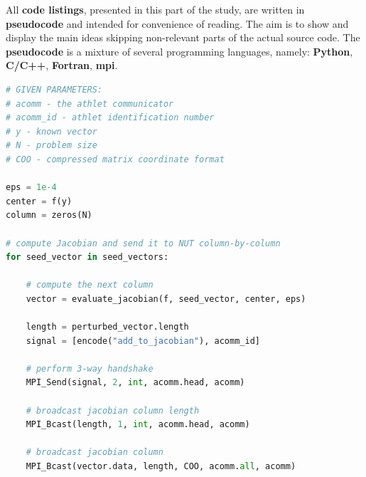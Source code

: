 All \textbf{code listings}, presented in this part of the study, are written in \textbf{pseudocode} and intended for convenience of reading. The aim is to show and display the main ideas skipping non-relevant parts of the actual source code. The \textbf{pseudocode} is a mixture of several programming languages, namely: \textbf{Python}, \textbf{C/C++}, \textbf{Fortran}, \textbf{\acrshort{mpi}}.\\


\begin{minipage}{\linewidth}
\begin{lstlisting}[language=python, caption={Pseudocode of the original \acrshort{athlet}-\acrshort{nut} coupling: \acrshort{athlet} part}, frame=single, label={lst:athlet-grs-defaul:athlet}]
# GIVEN PARAMETERS:
# acomm - the athlet communicator
# acomm_id - athlet identification number 
# y - known vector
# N - problem size
# COO - compressed matrix coordinate format

eps = 1e-4
center = f(y)
column = zeros(N)

# compute Jacobian and send it to NUT column-by-column
for seed_vector in seed_vectors:

	# compute the next column
	vector = evaluate_jacobian(f, seed_vector, center, eps)
	
	length = perturbed_vector.length
	signal = [encode("add_to_jacobian"), acomm_id]
	
	# perform 3-way handshake
	MPI_Send(signal, 2, int, acomm.head, acomm)
	
	# broadcast jacobian column length
	MPI_Bcast(length, 1, int, acomm.head, acomm)
	
	# broadcast jacobian column
	MPI_Bcast(vector.data, length, COO, acomm.all, acomm)
	

\end{lstlisting}
\end{minipage}



